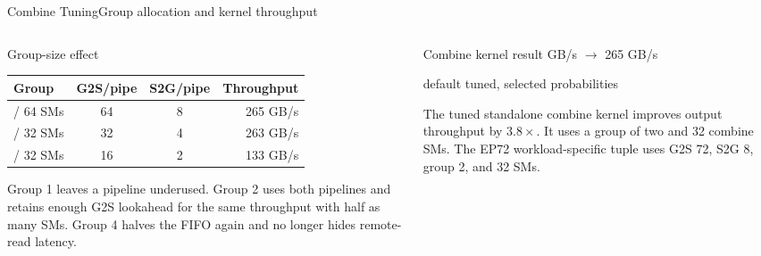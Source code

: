 \documentclass[aspectratio=169,10pt]{beamer}
\renewcommand{\NvidiaSource}[1]{}
\newcommand{\LocalSource}[1]{\NvidiaSource{\texttt{#1}}}
\begin{document}
\begin{frame}{Combine Tuning}{Group allocation and kernel throughput}
  \LocalSource{notes/hybrid-ep-sparse-opt-new.md}
  \begin{columns}[T,onlytextwidth]
    \begin{column}{.53\textwidth}
      {\NvidiaSansMedium Group-size effect}\NvidiaTightRule{.6pt}\vspace{.04in}
      {\renewcommand{\arraystretch}{1.13}
      \fontsize{8.2}{9.8}\selectfont
      \begin{tabularx}{\linewidth}{@{}>{\NvidiaSansMedium}l c c r@{}}
        \toprule
        Group & G2S/pipe & S2G/pipe & Throughput \\
        \midrule
        1 / 64 SMs & 64 & 8 & 265 GB/s \\
        2 / 32 SMs & 32 & 4 & 263 GB/s \\
        4 / 32 SMs & 16 & 2 & 133 GB/s \\
        \bottomrule
      \end{tabularx}\par}
      \vspace{.08in}
      {\fontsize{8.5}{10.0}\selectfont\setlength{\parskip}{0pt}\noindent
      Group 1 leaves a pipeline underused. Group 2 uses both pipelines and retains enough G2S
      lookahead for the same throughput with half as many SMs. Group 4 halves the FIFO again and
      no longer hides remote-read latency.\par}
    \end{column}
    \begin{column}{.41\textwidth}
      {\NvidiaSansMedium Combine kernel result}\NvidiaTightRule{.6pt}\vspace{.04in}
      {\NvidiaSansMedium\fontsize{13}{15.5} GB/s $\rightarrow$ 265 GB/s}\par
      {\fontsize{8}{9.5}\selectfont\setlength{\parskip}{0pt}\noindent
      default \hfill tuned, selected probabilities\par}
      \vspace{.10in}
      {\fontsize{8.5}{10.0}\selectfont\setlength{\parskip}{0pt}\noindent
      The tuned standalone combine kernel improves output throughput by \textbf{$3.8\times$}. It
      uses a group of two and 32 combine SMs. The EP72 workload-specific tuple uses G2S 72,
      S2G 8, group 2, and 32 SMs.\par}
    \end{column}
  \end{columns}
\end{frame}
\end{document}
